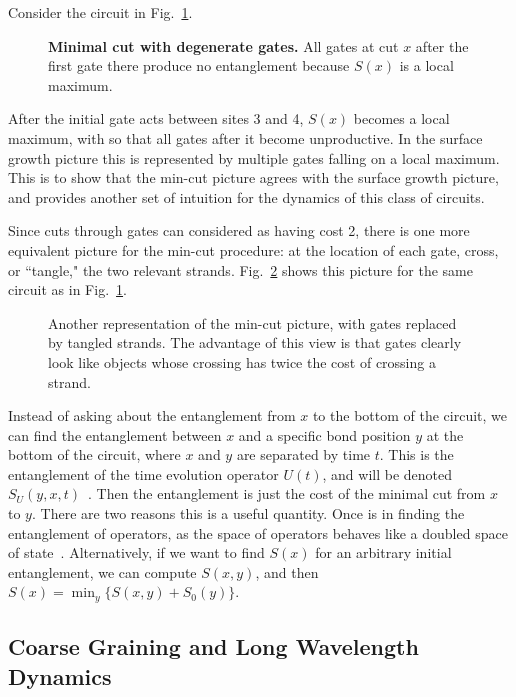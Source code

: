 Consider the circuit in Fig.~\ref{fig:degeneratemincut}.
\begin{figure}
	\centering
	
	\caption{\textbf{Minimal cut with degenerate gates.} All gates at cut $x$ after the first gate there produce no entanglement because $S(x)$ is a local maximum.}
	\label{fig:degeneratemincut}
\end{figure}
After the initial gate acts between sites 3 and 4, $S(x)$ becomes a local maximum, with so that all gates after it become unproductive. In the surface growth picture this is represented by multiple gates falling on a local maximum. This is to show that the min-cut picture agrees with the surface growth picture, and provides another set of intuition for the dynamics of this class of circuits.

Since cuts through gates can considered as having cost 2, there is one more equivalent picture for the min-cut procedure: at the location of each gate, cross, or ``tangle," the two relevant strands. Fig.~\ref{fig:anothermincut} shows this picture for the same circuit as in Fig.~\ref{fig:degeneratemincut}.
\begin{figure}
	\centering
	
	\caption{Another representation of the min-cut picture, with gates replaced by tangled strands. The advantage of this view is that gates clearly look like objects whose crossing has twice the cost of crossing a strand.}
	\label{fig:anothermincut}
\end{figure}

Instead of asking about the entanglement from $x$ to the bottom of the circuit, we can find the entanglement between $x$ and a specific bond position $y$ at the bottom of the circuit, where $x$ and $y$ are separated by time $t$. This is the entanglement of the time evolution operator $U(t)$, and will be denoted $S_U(y,x,t)$~\cite{Jonay18}. Then the entanglement is just the cost of the minimal cut from $x$ to $y$. There are two reasons this is a useful quantity. Once is in finding the entanglement of operators, as the space of operators behaves like a doubled space of state~\cite{Jonay17, Jonay18}. Alternatively, if we want to find $S(x)$ for an arbitrary initial entanglement, we can compute $S(x,y)$, and then $S(x) = \min_y\{S(x,y) + S_0(y)\}$.

\subsection{Coarse Graining and Long Wavelength Dynamics} \label{sub:coarse}

